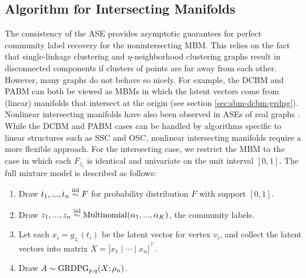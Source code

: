 \documentclass[
  12pt,
]{article}
\providecommand{\tightlist}{%
  \setlength{\itemsep}{0pt}\setlength{\parskip}{0pt}}
\theoremstyle{definition}
\theoremstyle{definition}
\theoremstyle{definition}
\theoremstyle{definition}
\theoremstyle{remark}
\begin{document}
\hypertarget{sec:intersect}{%
\subsection{Algorithm for Intersecting Manifolds}\label{sec:intersect}}

The consistency of the ASE provides asymptotic guarantees for perfect community label recovery for the nonintersecting MBM.
This relies on the fact that single-linkage clustering and \(\eta\)-neighborhood clustering graphs result in disconnected components if clusters of points are far away from each other.
However, many graphs do not behave so nicely.
For example, the DCBM and PABM can both be viewed as MBMs in which the latent vectors come from (linear) manifolds that intersect at the origin (see section \ref{sec:sbm-dcbm-grdpg}).
Nonlinear intersecting manifolds have also been observed in ASEs of real graphs \citep{SannaPassino2022, https://doi.org/10.48550/arxiv.1709.05454}.
While the DCBM and PABM cases can be handled by algorithms specific to linear structures such as SSC and OSC, nonlinear intersecting manifolds require a more flexible approach.
For the intersecting case, we restrict the MBM to the case in which each \(F_{z_i}\) is identical and univariate on the unit interval \([0, 1]\).
The full mixture model is described as follows:

\begin{enumerate}
\def\labelenumi{\arabic{enumi}.}
\tightlist
\item
  Draw \(t_1, ..., t_n \stackrel{\mathrm{iid}}{\sim} F\) for probability distribution \(F\) with support \([0, 1]\).
\item
  Draw \(z_1, ..., z_n \stackrel{\mathrm{iid}}{\sim} \mathrm{Multinomial}(\alpha_1, ..., \alpha_K)\), the community labels.
\item
  Let each \(x_i = g_{z_i}(t_i)\) be the latent vector for vertex \(v_i\), and collect the latent vectors into matrix \(X = \Big[ x_1 \mid \cdots \mid x_n \Big]^\top\).
\item
  Draw \(A \sim \mathrm{GRDPG}_{p,q}(X; \rho_n)\).
\end{enumerate}
\end{document}

